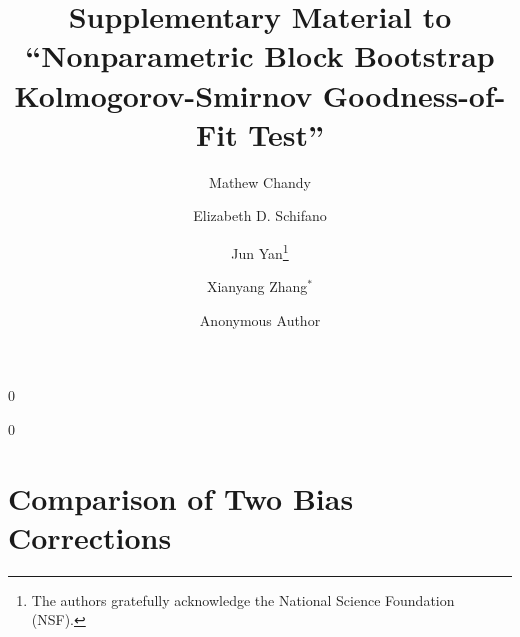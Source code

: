 \documentclass[12pt]{article}
\newcommand{\blind}{0}
\begin{document}
%

\def\spacingset#1{\renewcommand{\baselinestretch}%
{#1}\small\normalsize} \spacingset{1}



\title{\bf Supplementary Material to\\
  ``Nonparametric Block Bootstrap Kolmogorov-Smirnov Goodness-of-Fit Test''
}
\blind
{
  \author[1,2]{Mathew Chandy}
  \author[1]{Elizabeth D. Schifano}
  \author[1]{Jun Yan\thanks{
    The authors gratefully acknowledge the National Science Foundation (NSF).}\hspace{.2cm}}
  \author[3]{Xianyang Zhang$^{\ast}$ }
  \maketitle
} \fi

\blind
{
  \bigskip
  \bigskip
  \bigskip
  \author{Anonymous Author}
} \fi

\maketitle

\section{Comparison of Two Bias Corrections}
\end{document}
